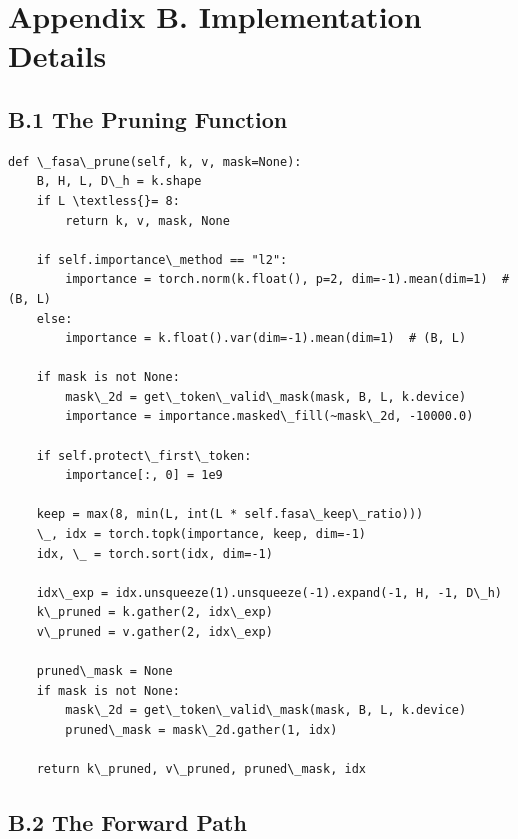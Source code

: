 
\section{Appendix B. Implementation Details}

\subsection{B.1 The Pruning Function}

\begin{lstlisting}
def \_fasa\_prune(self, k, v, mask=None):
    B, H, L, D\_h = k.shape
    if L \textless{}= 8:
        return k, v, mask, None
    
    if self.importance\_method == "l2":
        importance = torch.norm(k.float(), p=2, dim=-1).mean(dim=1)  # (B, L)
    else:
        importance = k.float().var(dim=-1).mean(dim=1)  # (B, L)
    
    if mask is not None:
        mask\_2d = get\_token\_valid\_mask(mask, B, L, k.device)
        importance = importance.masked\_fill(~mask\_2d, -10000.0)
    
    if self.protect\_first\_token:
        importance[:, 0] = 1e9
    
    keep = max(8, min(L, int(L * self.fasa\_keep\_ratio)))
    \_, idx = torch.topk(importance, keep, dim=-1)
    idx, \_ = torch.sort(idx, dim=-1)
    
    idx\_exp = idx.unsqueeze(1).unsqueeze(-1).expand(-1, H, -1, D\_h)
    k\_pruned = k.gather(2, idx\_exp)
    v\_pruned = v.gather(2, idx\_exp)
    
    pruned\_mask = None
    if mask is not None:
        mask\_2d = get\_token\_valid\_mask(mask, B, L, k.device)
        pruned\_mask = mask\_2d.gather(1, idx)
    
    return k\_pruned, v\_pruned, pruned\_mask, idx
\end{lstlisting}

\subsection{B.2 The Forward Path}

